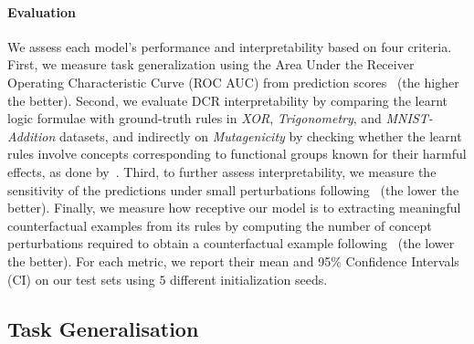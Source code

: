 \paragraph{Evaluation}
We assess each model's performance and interpretability based on four criteria. First, we measure task generalization using the Area Under the Receiver Operating Characteristic Curve (ROC AUC) from prediction scores~\cite{hand2001simple} (the higher the better).
Second, we evaluate DCR interpretability by comparing the learnt logic formulae with ground-truth rules in \emph{XOR}, \emph{Trigonometry}, and \emph{MNIST-Addition} datasets, and indirectly on \emph{Mutagenicity} by checking whether the learnt rules involve concepts corresponding to functional groups known for their harmful effects, as done by~\citet{ying2019gnnexplainer}. Third, to further assess interpretability, we measure 
the sensitivity of the predictions under small perturbations following~\citet{yeh2019fidelity} (the lower the better). Finally, we measure how receptive our model is to extracting meaningful counterfactual examples from its rules by computing the number of concept perturbations required to obtain a counterfactual example following~\citet{wachter2017counterfactual} (the lower the better).
For each metric, %
we report their mean and 95\% Confidence Intervals (CI) on our test sets using $5$ different initialization seeds.

\subsection{Task Generalisation}
